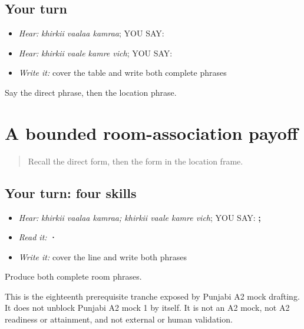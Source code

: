 \subsection*{Your turn}
\begin{itemize}
\raggedright
  \item \emph{Hear:} \emph{khirkii vaalaa kamraa}; YOU SAY: \textbf{  }
  \item \emph{Hear:} \emph{khirkii vaale kamre vich}; YOU SAY: \textbf{   }
  \item \emph{Write it:} cover the table and write both complete phrases
\end{itemize}

\begin{tcolorbox}[breakable,colback=teal!4,colframe=teal!35!black,title={Before you move on}]
Say the direct phrase, then the location phrase.
\end{tcolorbox}
\section[\texorpdfstring{\pa{ਖਿੜਕੀ} \pa{ਵਾਲਾ} \pa{ਕਮਰਾ} … (khirkii vaalaa …)}{ਖਿੜਕੀ ਵਾਲਾ ਕਮਰਾ … (khirkii vaalaa …)}]{A bounded room-association payoff}

\label{lesson:PA-C195-payoff}



\begin{quote}
Recall the direct form, then the form in the location frame.
\end{quote}

\subsection*{Your turn: four skills}
\begin{itemize}
\raggedright
  \item \emph{Hear:} \emph{khirkii vaalaa kamraa; khirkii vaale kamre vich}; YOU SAY: \textbf{  ;    }
  \item \emph{Read it:} \textbf{   ·    }
  \item \emph{Write it:} cover the line and write both phrases
\end{itemize}

\begin{tcolorbox}[breakable,colback=teal!4,colframe=teal!35!black,title={Before you move on}]
Produce both complete room phrases.

This is the eighteenth prerequisite tranche exposed by Punjabi A2 mock drafting. It does not unblock Punjabi A2 mock 1 by itself. It is not an A2 mock, not A2 readiness or attainment, and not external or human validation.
\end{tcolorbox}
